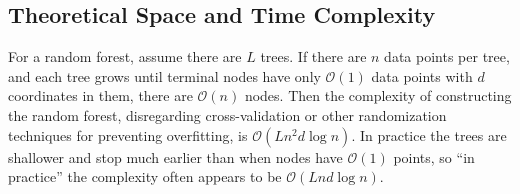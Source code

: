 \documentclass{article} %
\providecommand{\mc}[1]{\mathcal{#1}}
\begin{document}




\subsection{Theoretical Space and Time Complexity}

For a random forest, assume there are $L$ trees.  
If there are $n$ data points per tree, and each tree grows until terminal nodes have only $\mc O(1)$ data points with $d$ coordinates in them, there are $\mc O(n)$ nodes.
Then the complexity of constructing the random forest, disregarding cross-validation or other randomization techniques for preventing overfitting, is $\mc O(Ln^2d\log n)$. In practice the trees are shallower and stop much earlier than when nodes have $\mc O(1)$ points, so ``in practice'' the complexity often appears to be $\mc O(Lnd\log n)$.
\end{document}
